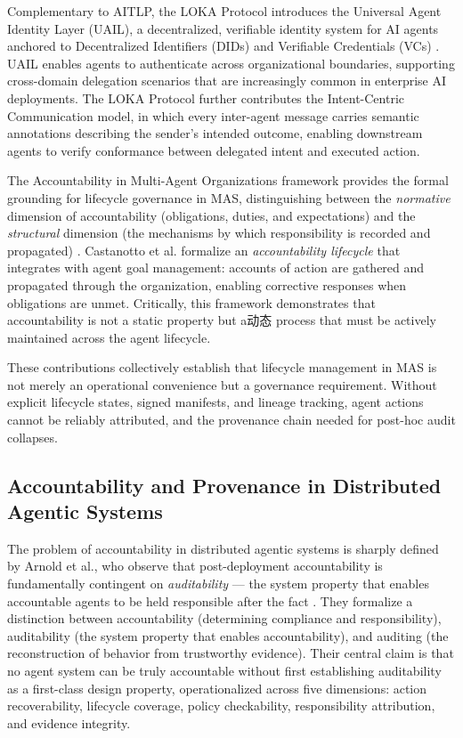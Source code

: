 Complementary to AITLP, the LOKA Protocol introduces the Universal Agent Identity Layer (UAIL), a decentralized, verifiable identity system for AI agents anchored to Decentralized Identifiers (DIDs) and Verifiable Credentials (VCs) \citep{abeywickrama2025loka}. UAIL enables agents to authenticate across organizational boundaries, supporting cross-domain delegation scenarios that are increasingly common in enterprise AI deployments. The LOKA Protocol further contributes the Intent-Centric Communication model, in which every inter-agent message carries semantic annotations describing the sender's intended outcome, enabling downstream agents to verify conformance between delegated intent and executed action.

The Accountability in Multi-Agent Organizations framework provides the formal grounding for lifecycle governance in MAS, distinguishing between the \emph{normative} dimension of accountability (obligations, duties, and expectations) and the \emph{structural} dimension (the mechanisms by which responsibility is recorded and propagated) \citep{castanotto2023accountability}. Castanotto et al. formalize an \emph{accountability lifecycle} that integrates with agent goal management: accounts of action are gathered and propagated through the organization, enabling corrective responses when obligations are unmet. Critically, this framework demonstrates that accountability is not a static property but a动态 process that must be actively maintained across the agent lifecycle.

These contributions collectively establish that lifecycle management in MAS is not merely an operational convenience but a governance requirement. Without explicit lifecycle states, signed manifests, and lineage tracking, agent actions cannot be reliably attributed, and the provenance chain needed for post-hoc audit collapses.

\subsection{Accountability and Provenance in Distributed Agentic Systems}

The problem of accountability in distributed agentic systems is sharply defined by Arnold et al., who observe that post-deployment accountability is fundamentally contingent on \emph{auditability} — the system property that enables accountable agents to be held responsible after the fact \citep{arnold2025auditability}. They formalize a distinction between accountability (determining compliance and responsibility), auditability (the system property that enables accountability), and auditing (the reconstruction of behavior from trustworthy evidence). Their central claim is that no agent system can be truly accountable without first establishing auditability as a first-class design property, operationalized across five dimensions: action recoverability, lifecycle coverage, policy checkability, responsibility attribution, and evidence integrity.

